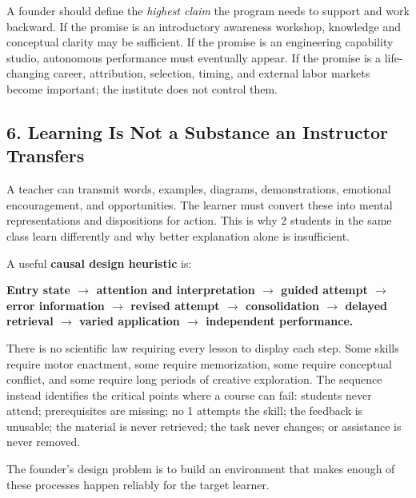 A founder should define the \emph{highest claim} the program needs to support and work backward. If the promise is an introductory awareness workshop, knowledge and conceptual clarity may be sufficient. If the promise is an engineering capability studio, autonomous performance must eventually appear. If the promise is a life-changing career, attribution, selection, timing, and external labor markets become important; the institute does not control them.

\subsection*{6. Learning Is Not a Substance an Instructor Transfers}

A teacher can transmit words, examples, diagrams, demonstrations, emotional encouragement, and opportunities. The learner must convert these into mental representations and dispositions for action. This is why 2 students in the same class learn differently and why better explanation alone is insufficient.

A useful \textbf{causal design heuristic} is:
\begin{center}
\textbf{Entry state $\to$ attention and interpretation $\to$ guided attempt $\to$ error information $\to$ revised attempt $\to$ consolidation $\to$ delayed retrieval $\to$ varied application $\to$ independent performance.}
\end{center}

There is no scientific law requiring every lesson to display each step. Some skills require motor enactment, some require memorization, some require conceptual conflict, and some require long periods of creative exploration. The sequence instead identifies the critical points where a course can fail: students never attend; prerequisites are missing; no 1 attempts the skill; the feedback is unusable; the material is never retrieved; the task never changes; or assistance is never removed.

The founder's design problem is to build an environment that makes enough of these processes happen reliably for the target learner.
